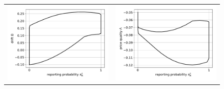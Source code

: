 \documentclass{article}
\begin{document}
\begin{figure}[h]
\begin{center}
\begin{tabular}{cc}
			\includegraphics[scale=.5]{reporting_probability_drift} & \includegraphics[scale=.5]{reporting_probability_price_quality} 
		\end{tabular}
	\end{center}
\end{figure}
\end{document}
